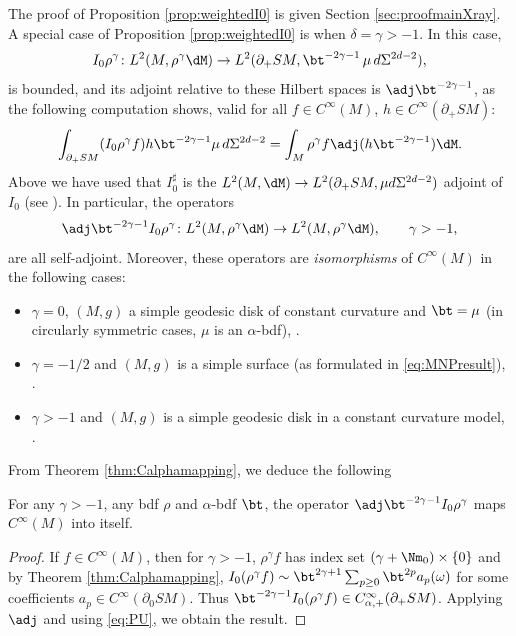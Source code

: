 The proof of Proposition \ref{prop:weightedI0} is given Section \ref{sec:proofmainXray}. A special case of Proposition \ref{prop:weightedI0} is when $\delta = \gamma > -1$. In this case,
\begin{equation*}
I_0 \rho^{\gamma} \colon L^2(M, \rho^{\gamma}\dM) \to L^2(\partial_+ SM, \bt^{-2\gamma-1} \, \mu \, d\Sigma^{2d-2}),
\end{equation*}
is bounded, and its adjoint relative to these Hilbert spaces is $\adj \bt^{-2\gamma-1}$, as the following computation shows, valid for all $f\in C^\infty(M)$, $h \in C^\infty(\partial_+ SM)$:
\begin{equation*}
\int_{\partial_+ SM} (I_0 \rho^\gamma f) h \bt^{-2\gamma-1} \mu\,d\Sigma^{2d-2} = \int_{M} \rho^\gamma f \adj (h \bt^{-2\gamma-1}) \dM.
\end{equation*}
Above we have used that $I_0^\sharp$ is the $L^2(M,\dM)\to L^2(\partial_+ SM, \mu d\Sigma^{2d-2})$ adjoint of $I_0$ (see \eg \cite[Lem.\,4.1.4]{Paternain2021}). In particular, the operators
\begin{equation*}
\adj \bt^{-2\gamma-1} I_0 \rho^\gamma \colon L^2(M, \rho^{\gamma}\dM) \to L^2(M, \rho^{\gamma}\dM), \qquad \gamma > -1,
\end{equation*}
are all self-adjoint. Moreover, these operators are {\em isomorphisms} of $C^\infty(M)$ in the following cases:
\begin{itemize}
\item $\gamma = 0$, $(M,g)$ a simple geodesic disk of constant curvature and $\bt = \mu$ (in circularly symmetric cases, $\mu$ is an $\alpha$-bdf), \cf \cite{Monard2019a}.
\item $\gamma = -1/2$ and $(M,g)$ is a simple surface (as formulated in \eqref{eq:MNPresult}), \cf \cite{Monard2019}.
\item $\gamma>-1$ and $(M,g)$ is a simple geodesic disk in a constant curvature model, \cf \cite{Mishra2022}.
\end{itemize}

From Theorem \ref{thm:Calphamapping}, we deduce the following
\begin{Lemma}
For any $\gamma>-1$, any bdf $\rho$ and $\alpha$-bdf $\bt$, the operator $\adj \bt^{-2\gamma-1} I_0 \rho^\gamma$ maps $C^\infty(M)$ into itself.
\end{Lemma}
\begin{proof} If $f\in C^\infty(M)$, then for $\gamma>-1$, $\rho^\gamma f$ has index set $(\gamma + \Nm_0)\times \{0\}$ and by
Theorem \ref{thm:Calphamapping}, $I_0 (\rho^\gamma f) \sim \bt^{2\gamma+1} \sum_{p\ge 0} \bt^{2p} a_p(\omega)$ for some coefficients
$a_p\in C^\infty(\partial_0 SM)$. Thus $\bt^{-2\gamma-1} I_0 (\rho^\gamma f)\in C_{\alpha,+}^\infty(\partial_+ SM)$. Applying $\adj$
and using \eqref{eq:PU}, we obtain the result.
\end{proof}

